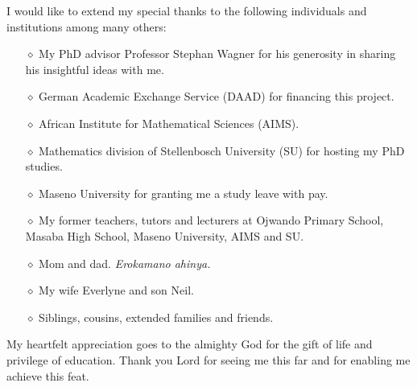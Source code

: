 %
I would like to extend my special  thanks to the following individuals and institutions among many others:
\begin{itemize}
\item[$\diamond$] My PhD advisor Professor Stephan Wagner for his generosity in sharing his insightful ideas with me.
\item[$\diamond$] German Academic Exchange Service (DAAD) for financing this project.
\item[$\diamond$] African Institute for Mathematical Sciences (AIMS).
\item[$\diamond$] Mathematics division of Stellenbosch University (SU) for hosting my PhD studies.
\item[$\diamond$] Maseno University for granting me a study leave with pay.
\item[$\diamond$] My former teachers, tutors and lecturers at Ojwando Primary School, Masaba High School, Maseno University, AIMS and SU.
\item[$\diamond$] Mom and dad. \emph{Erokamano ahinya.}
\item[$\diamond$] My wife Everlyne and son Neil.
\item[$\diamond$] Siblings, cousins, extended families and friends.

\end{itemize}
My heartfelt appreciation goes to the almighty God for the gift of life and privilege of education. Thank you Lord for seeing me this far and for enabling me achieve this feat.%